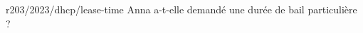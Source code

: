 \begin{question}{r203/2023/dhcp/lease-time}
  Anna a-t-elle demandé une durée de bail particulière ?
  \begin{reponses}
  \end{reponses}
\end{question}
